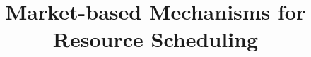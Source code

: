 \documentclass{acm_proc_article-sp}
\begin{document}
\title{Market-based Mechanisms for Resource Scheduling}
%
%
%
%
%
\end{document}
